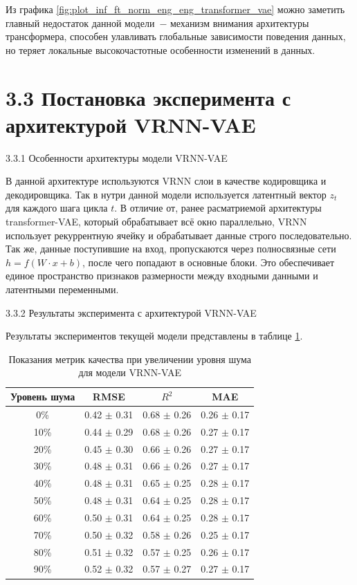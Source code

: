 \documentclass[14pt, a4paper, oneside]{extreport}
\begin{document}
Из графика \ref{fig:plot_inf_ft_norm_eng_eng_transformer_vae} можно заметить главный недостаток данной модели~$-$ механизм внимания архитектуры трансформера, способен улавливать глобальные зависимости поведения данных, но теряет локальные высокочастотные особенности изменений в данных.

\clearpage
\section{3.3 Постановка эксперимента с архитектурой VRNN-VAE}
{3.3.1 Особенности архитектуры модели VRNN-VAE}
\vspace{1em}

В данной архитектуре используются VRNN слои в качестве кодировщика и декодировщика. Так в нутри данной модели используется латентный вектор $z_t$ для каждого шага цикла $t$. В отличие от, ранее расматриемой архитектуры transformer-VAE, который обрабатывает всё окно параллельно, VRNN использует рекуррентную ячейку и обрабатывает данные строго последовательно. Так же, данные поступившие на вход, пропускаются через полносвязные сети $h = f(W \cdot x + b)$, после чего попадают в основные блоки. Это обеспечивает единое пространство признаков размерности между входными данными и латентными переменными.
\vspace{1em}

{3.3.2 Результаты эксперимента с архитектурой VRNN-VAE}
\vspace{1em}

Результаты экспериментов текущей модели представлены в таблице \ref{tab:vrnn_table_res}.
\begin{table}[htbp]
\captionsetup{justification=raggedleft, singlelinecheck=off, labelsep=hyphen}
\centering
\caption{Показания метрик качества при увеличении уровня шума для модели VRNN-VAE}
\begin{tabular}{|c|c|c|c|}
\hline
Уровень шума & RMSE & $R^2$ & MAE \\
\hline
0\% & 0.42 $\pm$ 0.31  & 0.68 $\pm$ 0.26 & 0.26 $\pm$ 0.17 \\ \hline
10\% & 0.44 $\pm$ 0.29 & 0.68 $\pm$ 0.26 & 0.27 $\pm$ 0.17 \\ \hline
20\% & 0.45 $\pm$ 0.30 & 0.66 $\pm$ 0.26 & 0.27 $\pm$ 0.17 \\ \hline
30\% & 0.48 $\pm$ 0.31 & 0.66 $\pm$ 0.26 & 0.27 $\pm$ 0.17 \\ \hline
40\% & 0.48 $\pm$ 0.31 & 0.65 $\pm$ 0.25 & 0.28 $\pm$ 0.17 \\ \hline
50\% & 0.48 $\pm$ 0.31 & 0.64 $\pm$ 0.25 & 0.28 $\pm$ 0.17 \\ \hline
60\% & 0.50 $\pm$ 0.31 & 0.64 $\pm$ 0.25 & 0.28 $\pm$ 0.17 \\ \hline
70\% & 0.50 $\pm$ 0.32 & 0.58 $\pm$ 0.26 & 0.25 $\pm$ 0.17 \\ \hline
80\% & 0.51 $\pm$ 0.32 & 0.57 $\pm$ 0.25 & 0.26 $\pm$ 0.17 \\ \hline
90\% & 0.52 $\pm$ 0.32 & 0.57 $\pm$ 0.27 & 0.27 $\pm$ 0.17 \\ \hline
\end{tabular}
\label{tab:vrnn_table_res}
\end{table}
\end{document}

